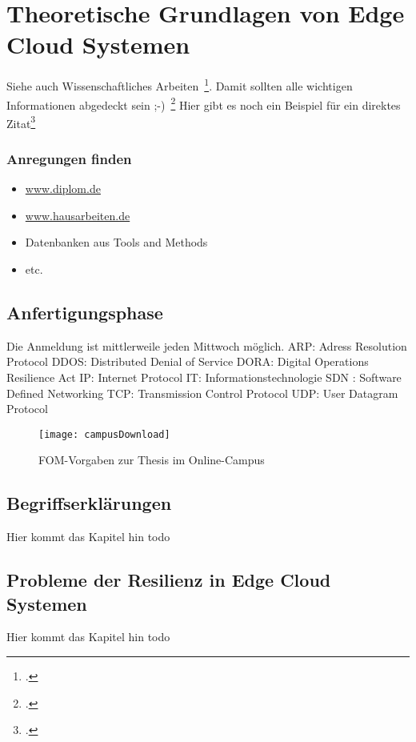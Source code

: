 \newpage
\section{Theoretische Grundlagen von Edge Cloud Systemen} \label{infos}
Siehe auch Wissenschaftliches Arbeiten~\footcite[\vglf][S. 1]{Balzert.2008}. %
Damit sollten alle wichtigen Informationen abgedeckt sein ;-)~\footcite[\vglf][]{Balzert.2008} %
Hier gibt es noch ein Beispiel für ein direktes Zitat\footcite[][]{Balzert.2008} %




\subsubsection{Anregungen finden}
\begin{itemize}
\item \href{http://www.diplom.de}{www.diplom.de}
\item \href{http://www.hausarbeiten.de}{www.hausarbeiten.de}
\item Datenbanken aus Tools and Methods
\item etc.
\end{itemize}

\newpage
\subsection{Anfertigungsphase}
Die Anmeldung ist mittlerweile jeden Mittwoch möglich. \ac{ARP}: Adress Resolution Protocol
\ac{DDOS}: Distributed Denial of Service
\ac{DORA}: Digital Operations Resilience Act
\ac{IP}: Internet Protocol
\ac{IT}: Informationstechnologie
\ac{SDN} : Software Defined Networking
\ac{TCP}: Transmission Control Protocol
\ac{UDP}: User Datagram Protocol

\begin{figure}[H]
\caption{FOM-Vorgaben zur Thesis im Online-Campus}
\texttt{[image: campusDownload]}
\\
\cite[Quelle: Vgl.][]{FOM}
\end{figure}

\subsection{Begriffserklärungen}

Hier kommt das Kapitel hin todo


\subsection{Probleme der Resilienz in Edge Cloud Systemen}

Hier kommt das Kapitel hin todo






